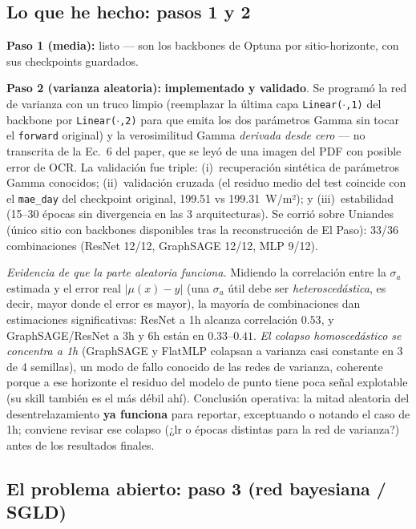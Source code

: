 \documentclass[12pt,a4paper]{article}
\begin{document}
\subsection{Lo que he hecho: pasos 1 y 2}

\textbf{Paso 1 (media):} listo --- son los backbones de Optuna por
sitio-horizonte, con sus checkpoints guardados.

\textbf{Paso 2 (varianza aleatoria):} \textbf{implementado y validado}. Se
programó la red de varianza con un truco limpio (reemplazar la última capa
\texttt{Linear($\cdot$,1)} del backbone por \texttt{Linear($\cdot$,2)} para
que emita los dos parámetros Gamma sin tocar el \texttt{forward} original) y
la verosimilitud Gamma \emph{derivada desde cero} --- no transcrita de la
Ec.~6 del paper, que se leyó de una imagen del PDF con posible error de OCR.
La validación fue triple: (i)~recuperación sintética de parámetros Gamma
conocidos; (ii)~validación cruzada (el residuo medio del test coincide con el
\texttt{mae\_day} del checkpoint original, 199.51 vs 199.31~W/m²); y
(iii)~estabilidad (15--30 épocas sin divergencia en las 3 arquitecturas). Se
corrió sobre Uniandes (único sitio con backbones disponibles tras la
reconstrucción de El Paso): 33/36 combinaciones (ResNet 12/12, GraphSAGE
12/12, MLP 9/12).

\emph{Evidencia de que la parte aleatoria funciona.} Midiendo la correlación
entre la $\sigma_a$ estimada y el error real $|\mu(x)-y|$ (una $\sigma_a$
útil debe ser \emph{heteroscedástica}, es decir, mayor donde el error es
mayor), la mayoría de combinaciones dan estimaciones significativas: ResNet a
1h alcanza correlación $0.53$, y GraphSAGE/ResNet a 3h y 6h están en
$0.33$--$0.41$. \emph{El colapso homoscedástico se concentra a 1h} (GraphSAGE
y FlatMLP colapsan a varianza casi constante en 3 de 4 semillas), un modo de
fallo conocido de las redes de varianza, coherente porque a ese horizonte el
residuo del modelo de punto tiene poca señal explotable (su skill también es
el más débil ahí). Conclusión operativa: la mitad aleatoria del
desentrelazamiento \textbf{ya funciona} para reportar, exceptuando o notando
el caso de 1h; conviene revisar ese colapso (¿lr o épocas distintas para la
red de varianza?) antes de los resultados finales.

\subsection{El problema abierto: paso 3 (red bayesiana / SGLD)}
\end{document}
